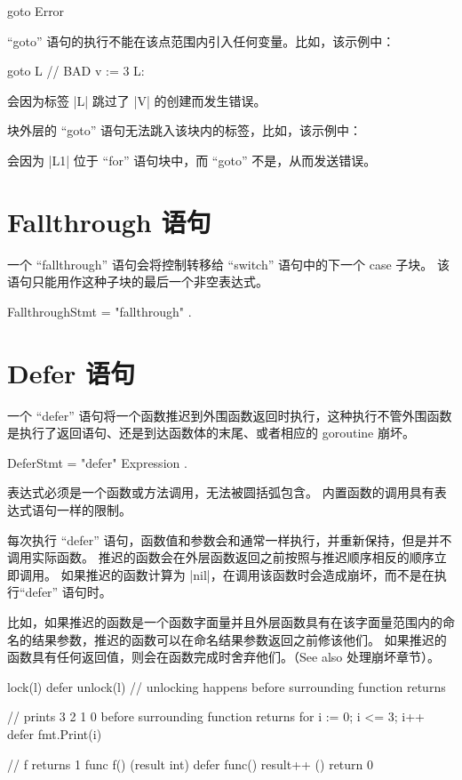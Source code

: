 \begin{golang}
goto Error
\end{golang}

``goto'' 语句的执行不能在该点范围内引入任何变量。比如，该示例中：
\begin{golang}
	goto L  // BAD
	v := 3
L:
\end{golang}
会因为标签 \code|L| 跳过了 \code|V| 的创建而发生错误。

块外层的 ``goto'' 语句无法跳入该块内的标签，比如，该示例中：
会因为 \code|L1| 位于 ``for'' 语句块中，而 ``goto'' 不是，从而发送错误。

\section{Fallthrough 语句}
一个 ``fallthrough'' 语句会将控制转移给 ``switch'' 语句中的下一个 case 子块。
该语句只能用作这种子块的最后一个非空表达式。
\begin{EBNF}
FallthroughStmt = "fallthrough" .
\end{EBNF}

\section{Defer 语句}
一个 ``defer'' 语句将一个函数推迟到外围函数返回时执行，这种执行不管外围函数是执行了返回语句、还是到达函数体的末尾、或者相应的 goroutine 崩坏。
\begin{EBNF}
DeferStmt = "defer" Expression .
\end{EBNF}

表达式必须是一个函数或方法调用，无法被圆括弧包含。
内置函数的调用具有表达式语句一样的限制。

每次执行 ``defer'' 语句，函数值和参数会和通常一样执行，并重新保持，但是并不调用实际函数。
推迟的函数会在外层函数返回之前按照与推迟顺序相反的顺序立即调用。
如果推迟的函数计算为 \code|nil|，在调用该函数时会造成崩坏，而不是在执行``defer'' 语句时。

比如，如果推迟的函数是一个函数字面量并且外层函数具有在该字面量范围内的命名的结果参数，推迟的函数可以在命名结果参数返回之前修该他们。
如果推迟的函数具有任何返回值，则会在函数完成时舍弃他们。（See also 处理崩坏章节）。
\begin{golang}
lock(l)
defer unlock(l)  // unlocking happens before surrounding function returns

// prints 3 2 1 0 before surrounding function returns
for i := 0; i <= 3; i++ {
	defer fmt.Print(i)
}

// f returns 1
func f() (result int) {
	defer func() {
		result++
	}()
	return 0
}
\end{golang}







